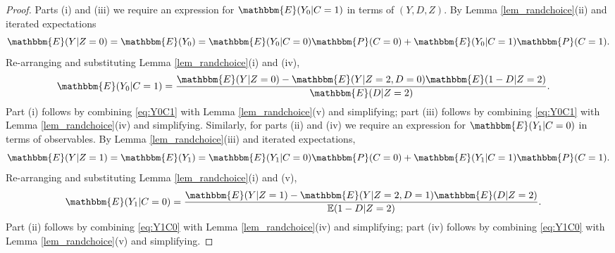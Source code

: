 \documentclass[12pt, a4paper, colorinlistoftodos]{article}
\begin{document}
\begin{proof}
Parts (i) and (iii) we require an expression for $\mathbbm{E}(Y_0|C=1)$ in terms of $(Y, D, Z)$.
By Lemma \ref{lem_randchoice}(ii) and iterated expectations 
\[
\mathbbm{E}(Y|Z=0) = \mathbbm{E}(Y_0) = \mathbbm{E}(Y_0|C=0) \mathbbm{P}(C=0) + \mathbbm{E}(Y_0|C=1) \mathbbm{P}(C=1).
\]
Re-arranging and substituting Lemma \ref{lem_randchoice}(i) and (iv),
\begin{align}
\mathbbm{E}(Y_0|C=1)  
&=  \frac{\mathbbm{E}(Y|Z=0) - \mathbbm{E}(Y|Z=2,D=0) \mathbbm{E}(1 - D|Z=2)}{\mathbbm{E}(D|Z=2)}.
\label{eq:Y0C1}
\end{align}
Part (i) follows by combining \eqref{eq:Y0C1} with Lemma \ref{lem_randchoice}(v) and simplifying; part (iii) follows by combining \eqref{eq:Y0C1} with Lemma \ref{lem_randchoice}(iv) and simplifying.
Similarly, for parts (ii) and (iv) we require an expression for $\mathbbm{E}(Y_1|C=0)$ in terms of observables.
By Lemma \ref{lem_randchoice}(iii) and iterated expectations,
\[
\mathbbm{E}(Y|Z=1) = \mathbbm{E}(Y_1) = \mathbbm{E}(Y_1|C=0)\mathbbm{P}(C=0) + \mathbbm{E}(Y_1|C=1) \mathbbm{P}(C=1).
\]
Re-arranging and substituting Lemma \ref{lem_randchoice}(i) and (v),
\begin{align}
\mathbbm{E}(Y_1|C=0) 
&=\frac{\mathbbm{E}(Y|Z=1) - \mathbbm{E}(Y|Z=2,D=1)\mathbbm{E}(D|Z=2)}{\mathbb{E}(1-D|Z=2)}.
\label{eq:Y1C0}
\end{align}
Part (ii) follows by combining \eqref{eq:Y1C0} with Lemma \ref{lem_randchoice}(iv) and simplifying; part (iv) follows by combining \eqref{eq:Y1C0} with Lemma \ref{lem_randchoice}(v) and simplifying.
\end{proof}

\newpage


\end{document}
